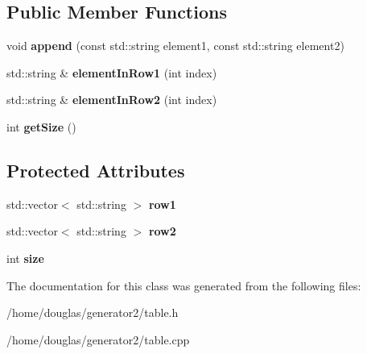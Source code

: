 \subsection*{Public Member Functions}
\begin{DoxyCompactItemize}
\item 
void {\bfseries append} (const std\+::string element1, const std\+::string element2)\hypertarget{classTable_a5b098915e07452e5f68b7e7f8c8bd016}{}\label{classTable_a5b098915e07452e5f68b7e7f8c8bd016}

\item 
std\+::string \& {\bfseries element\+In\+Row1} (int index)\hypertarget{classTable_ae1cbac8c672ef6f9dc9e63ff830c7207}{}\label{classTable_ae1cbac8c672ef6f9dc9e63ff830c7207}

\item 
std\+::string \& {\bfseries element\+In\+Row2} (int index)\hypertarget{classTable_a801db729dc71b2b8a8a3e8c2662c1e0d}{}\label{classTable_a801db729dc71b2b8a8a3e8c2662c1e0d}

\item 
int {\bfseries get\+Size} ()\hypertarget{classTable_a5376bbd02299c39a0372e6c8eddc88bc}{}\label{classTable_a5376bbd02299c39a0372e6c8eddc88bc}

\end{DoxyCompactItemize}
\subsection*{Protected Attributes}
\begin{DoxyCompactItemize}
\item 
std\+::vector$<$ std\+::string $>$ {\bfseries row1}\hypertarget{classTable_a29a426e05effd465738028efbb523907}{}\label{classTable_a29a426e05effd465738028efbb523907}

\item 
std\+::vector$<$ std\+::string $>$ {\bfseries row2}\hypertarget{classTable_a7714297b056e58e8b0fef9e1c963a684}{}\label{classTable_a7714297b056e58e8b0fef9e1c963a684}

\item 
int {\bfseries size}\hypertarget{classTable_ac187aaf2e5d8b52fdad9e4ce3403b099}{}\label{classTable_ac187aaf2e5d8b52fdad9e4ce3403b099}

\end{DoxyCompactItemize}


The documentation for this class was generated from the following files\+:\begin{DoxyCompactItemize}
\item 
/home/douglas/generator2/table.\+h\item 
/home/douglas/generator2/table.\+cpp\end{DoxyCompactItemize}
